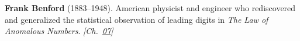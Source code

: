 \textbf{Frank Benford} (1883–1948). American physicist and engineer who rediscovered and generalized the statistical observation of leading digits in \emph{The Law of Anomalous Numbers}. \emph{[Ch.~\hyperref[ch:billiardsconicsporism]{07}]}

